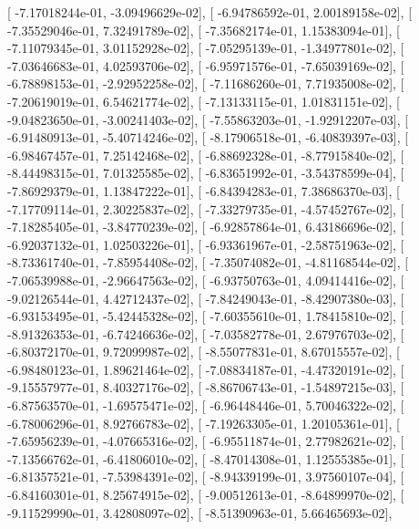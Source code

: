 \documentclass{article}
\begin{document}
       [ -7.17018244e-01,  -3.09496629e-02],
       [ -6.94786592e-01,   2.00189158e-02],
       [ -7.35529046e-01,   7.32491789e-02],
       [ -7.35682174e-01,   1.15383094e-01],
       [ -7.11079345e-01,   3.01152928e-02],
       [ -7.05295139e-01,  -1.34977801e-02],
       [ -7.03646683e-01,   4.02593706e-02],
       [ -6.95971576e-01,  -7.65039169e-02],
       [ -6.78898153e-01,  -2.92952258e-02],
       [ -7.11686260e-01,   7.71935008e-02],
       [ -7.20619019e-01,   6.54621774e-02],
       [ -7.13133115e-01,   1.01831151e-02],
       [ -9.04823650e-01,  -3.00241403e-02],
       [ -7.55863203e-01,  -1.92912207e-03],
       [ -6.91480913e-01,  -5.40714246e-02],
       [ -8.17906518e-01,  -6.40839397e-03],
       [ -6.98467457e-01,   7.25142468e-02],
       [ -6.88692328e-01,  -8.77915840e-02],
       [ -8.44498315e-01,   7.01325585e-02],
       [ -6.83651992e-01,  -3.54378599e-04],
       [ -7.86929379e-01,   1.13847222e-01],
       [ -6.84394283e-01,   7.38686370e-03],
       [ -7.17709114e-01,   2.30225837e-02],
       [ -7.33279735e-01,  -4.57452767e-02],
       [ -7.18285405e-01,  -3.84770239e-02],
       [ -6.92857864e-01,   6.43186696e-02],
       [ -6.92037132e-01,   1.02503226e-01],
       [ -6.93361967e-01,  -2.58751963e-02],
       [ -8.73361740e-01,  -7.85954408e-02],
       [ -7.35074082e-01,  -4.81168544e-02],
       [ -7.06539988e-01,  -2.96647563e-02],
       [ -6.93750763e-01,   4.09414416e-02],
       [ -9.02126544e-01,   4.42712437e-02],
       [ -7.84249043e-01,  -8.42907380e-03],
       [ -6.93153495e-01,  -5.42445328e-02],
       [ -7.60355610e-01,   1.78415810e-02],
       [ -8.91326353e-01,  -6.74246636e-02],
       [ -7.03582778e-01,   2.67976703e-02],
       [ -6.80372170e-01,   9.72099987e-02],
       [ -8.55077831e-01,   8.67015557e-02],
       [ -6.98480123e-01,   1.89621464e-02],
       [ -7.08834187e-01,  -4.47320191e-02],
       [ -9.15557977e-01,   8.40327176e-02],
       [ -8.86706743e-01,  -1.54897215e-03],
       [ -6.87563570e-01,  -1.69575471e-02],
       [ -6.96448446e-01,   5.70046322e-02],
       [ -6.78006296e-01,   8.92766783e-02],
       [ -7.19263305e-01,   1.20105361e-01],
       [ -7.65956239e-01,  -4.07665316e-02],
       [ -6.95511874e-01,   2.77982621e-02],
       [ -7.13566762e-01,  -6.41806010e-02],
       [ -8.47014308e-01,   1.12555385e-01],
       [ -6.81357521e-01,  -7.53984391e-02],
       [ -8.94339199e-01,   3.97560107e-04],
       [ -6.84160301e-01,   8.25674915e-02],
       [ -9.00512613e-01,  -8.64899970e-02],
       [ -9.11529990e-01,   3.42808097e-02],
       [ -8.51390963e-01,   5.66465693e-02],
\end{document}
